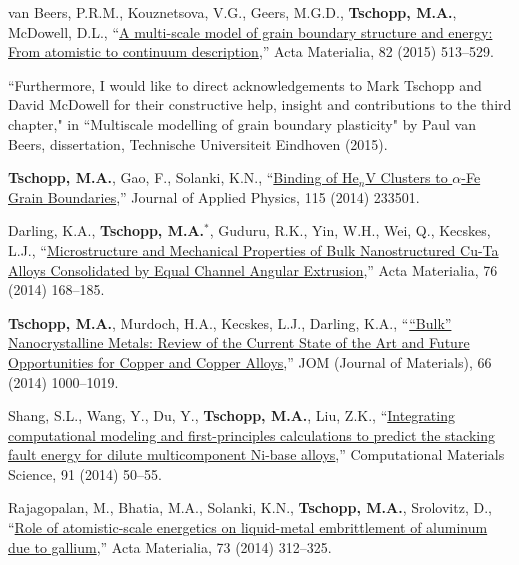 \begin{cvlist}
\item
van Beers, P.R.M., Kouznetsova, V.G., Geers, M.G.D., \textbf{Tschopp, M.A.}, McDowell, D.L., ``\href{http://dx.doi.org/10.1016/j.actamat.2014.08.045}{A multi-scale model of grain boundary structure and energy: From atomistic to continuum description},'' Acta Materialia, 82 (2015) 513--529.
\begin{list2}
\item[$\star$] ``Furthermore, I would like to direct acknowledgements to Mark Tschopp and David McDowell for their constructive help, insight and contributions to the third chapter," in ``Multiscale modelling of grain boundary plasticity" by Paul van Beers, dissertation, Technische Universiteit Eindhoven (2015).
\end{list2}

\item
\textbf{Tschopp, M.A.}, Gao, F., Solanki, K.N., ``\href{http://dx.doi.org/10.1063/1.4883357}{Binding of He$_n$V Clusters to $\alpha$-Fe Grain Boundaries},'' Journal of Applied Physics, 115 (2014) 233501.

\item
Darling, K.A., \textbf{Tschopp, M.A.}$^\ast$, Guduru, R.K., Yin, W.H., Wei, Q., Kecskes, L.J., ``\href{http://dx.doi.org/10.1016/j.actamat.2014.04.074}{Microstructure and Mechanical Properties of Bulk Nanostructured Cu-Ta Alloys Consolidated by Equal Channel Angular Extrusion},'' Acta Materialia, 76 (2014) 168--185.

\item
\textbf{Tschopp, M.A.}, Murdoch, H.A., Kecskes, L.J., Darling, K.A., ``\href{http://dx.doi.org/10.1007/s11837-014-0978-z}{``Bulk'' Nanocrystalline Metals: Review of the Current State of the Art and Future Opportunities for Copper and Copper Alloys},'' JOM (Journal of Materials), 66 (2014) 1000--1019.

\item
Shang, S.L., Wang, Y., Du, Y., \textbf{Tschopp, M.A.}, Liu, Z.K., ``\href{http://dx.doi.org/10.1016/j.commatsci.2014.04.040}{Integrating computational modeling and first-principles calculations to predict the stacking fault energy for dilute multicomponent Ni-base alloys},'' Computational Materials Science, 91 (2014) 50--55.

\item
{Rajagopalan, M.}, {Bhatia, M.A.}, Solanki, K.N., \textbf{Tschopp, M.A.}, Srolovitz, D., ``\href{http://dx.doi.org/10.1016/j.actamat.2014.04.011}{Role of atomistic-scale energetics on liquid-metal embrittlement of aluminum due to gallium},'' Acta Materialia, 73 (2014) 312--325.


\end{cvlist}
